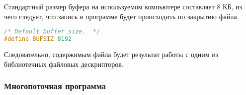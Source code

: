 Стандартный размер буфера на используемом компьютере составляет 8 КБ, из чего
следует, что запись в программе будет происходить по закрытию файла.

\begin{lstlisting}[language=c, caption={Стандартный размер буфера в библиотеке stdio}]
/* Default buffer size.  */
#define BUFSIZ 8192
\end{lstlisting}

Следовательно, содержимым файла будет результат работы с одним из библиотечных
файловых дескрипторов. \newline

\subsubsection{Многопоточная программа}

